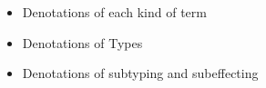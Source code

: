 \documentclass{report}
\begin{document}
\begin{itemize}
    \item Denotations of each kind of term
    \item Denotations of Types
    \item Denotations of subtyping and subeffecting
\end{itemize}
    
\end{document}
